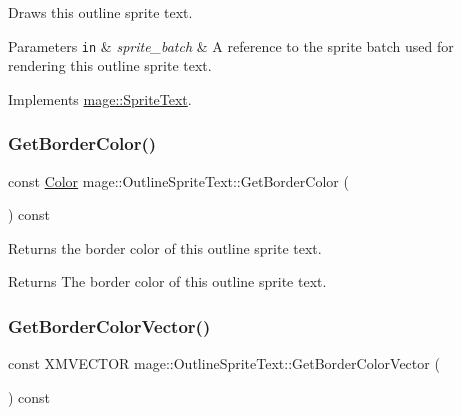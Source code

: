 Draws this outline sprite text.


\begin{DoxyParams}[1]{Parameters}
\mbox{\tt in}  & {\em sprite\+\_\+batch} & A reference to the sprite batch used for rendering this outline sprite text. \\
\hline
\end{DoxyParams}


Implements \hyperlink{classmage_1_1_sprite_text_a45d5ac8410d5a46b26e8491946a2ad9e}{mage\+::\+Sprite\+Text}.

\hypertarget{classmage_1_1_outline_sprite_text_a9b2c999e3775062cd07b57776f76789c}{}\label{classmage_1_1_outline_sprite_text_a9b2c999e3775062cd07b57776f76789c} 
\subsubsection{\texorpdfstring{Get\+Border\+Color()}{GetBorderColor()}}
{\footnotesize\ttfamily const \hyperlink{structmage_1_1_color}{Color} mage\+::\+Outline\+Sprite\+Text\+::\+Get\+Border\+Color (\begin{DoxyParamCaption}{ }\end{DoxyParamCaption}) const}

Returns the border color of this outline sprite text.

\begin{DoxyReturn}{Returns}
The border color of this outline sprite text. 
\end{DoxyReturn}
\hypertarget{classmage_1_1_outline_sprite_text_af4c03ed22f2e923af5f68eba5c39d9dc}{}\label{classmage_1_1_outline_sprite_text_af4c03ed22f2e923af5f68eba5c39d9dc} 
\subsubsection{\texorpdfstring{Get\+Border\+Color\+Vector()}{GetBorderColorVector()}}
{\footnotesize\ttfamily const X\+M\+V\+E\+C\+T\+OR mage\+::\+Outline\+Sprite\+Text\+::\+Get\+Border\+Color\+Vector (\begin{DoxyParamCaption}{ }\end{DoxyParamCaption}) const\hspace{0.3cm}{\ttfamily [private]}}

